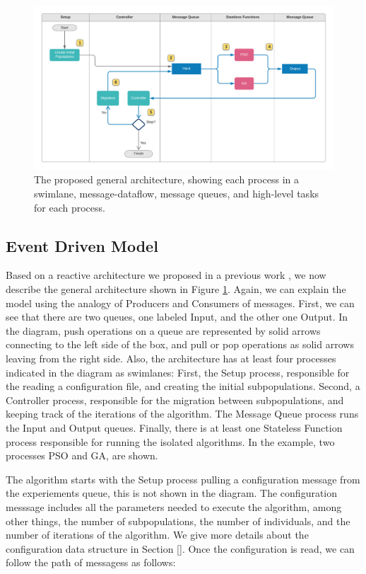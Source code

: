 \documentclass[review]{elsarticle}
\begin{document}
\begin{figure}[h]
    \centering
    \includegraphics[width=\textwidth]{kafkEOsmall}
    \caption{The proposed general architecture, 
     showing each process in a swimlane, message-dataflow,
     message queues, and high-level tasks for each process.} %
    \label{fig:kafkEO}
\end{figure}

\subsection{Event Driven Model} 
\label{edm}
Based on a reactive architecture we proposed in a previous work
\cite{guervos2018introducing}, we now describe the general architecture shown in
Figure \ref{fig:kafkEO}. Again, we can explain the model using the analogy
of Producers and Consumers of messages. First, we can see that
there are two queues, one labeled Input, and the other one Output. In the diagram, 
push operations on a queue are represented by solid arrows connecting to the left side
of the box, and pull or pop operations as solid arrows leaving from the right side.
Also, the architecture has at least four processes indicated in the diagram as
swimlanes: First, the Setup process, responsible for the reading a configuration
file, and creating the initial subpopulations. Second, a Controller process,
responsible for the migration between subpopulations, and keeping track of the
iterations of the algorithm. The Message Queue process runs the Input and Output
queues. Finally, there is at least one Stateless Function process responsible
for running the isolated algorithms. In the example, two processes PSO and GA,
are shown. 

The algorithm starts with the Setup process pulling a configuration message from
the experiements queue, this is not shown in the diagram. The configuration messsage 
includes all the parameters needed to execute the algorithm, among other things,
the number of subpopulations, the number of individuals, and the number of iterations
of the algorithm. We give more details about the configuration data structure
in Section []. Once the configuration is read, we can follow the path of 
messagess as follows:
\end{document}
